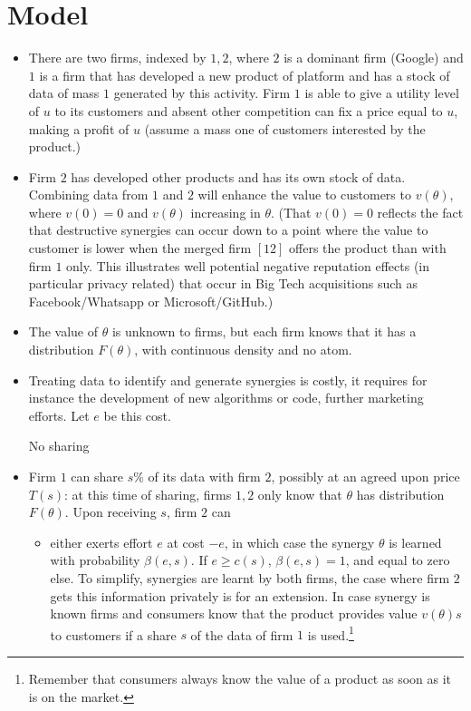 \documentclass[a4paper,leqno]{article}%
\renewcommand{\t}{\theta}
\begin{document}
\section{Model}
\begin{itemize}
    \item There are two firms, indexed by $1,2$, where $2$ is a dominant firm (Google) and $1$ is a firm that has developed a new product of platform and has a stock of data of mass $1$ generated by this activity. Firm $1$ is able to give a utility level of $u$ to its customers and absent other competition can fix a price equal to $u$, making a profit of $u$ (assume a mass one of customers interested by the product.)
    \item Firm $2$ has developed other products and has its own stock of data. Combining data from $1$ and $2$ will enhance the value to customers to $v(\t)$, where $v(0)=0$ and $v(\t)$ increasing in $\t$. (That $v(0)=0$ reflects the fact that destructive synergies can occur down to a point where the value to customer is lower when the merged firm $[12]$ offers the product than with firm $1$ only. This illustrates well potential negative reputation effects (in particular privacy related) that occur in Big Tech acquisitions such as Facebook/Whatsapp or Microsoft/GitHub.)
    \item The value of $\t$ is unknown to firms, but each firm knows that it has a distribution $F(\t)$, with continuous density and no atom.
    \item Treating data to identify and generate synergies is costly, it requires for instance the development of new algorithms or code, further marketing efforts. Let $e$ be this cost. 
    \item [No sharing]
    \item Firm $1$ can share $s\%$ of its data with firm $2$, possibly at an agreed upon price $T(s)$: at this time of sharing, firms $1,2$ only know that $\t$ has distribution $F(\t)$. Upon receiving $s$, firm $2$ can 
    \begin{itemize}
        \item either exerts effort $e$ at cost $-e$, in which case the synergy $\t$ is learned with probability $\beta(e,s)$. If $e\geq c(s)$, $\beta(e,s)=1$, and equal to zero else. To simplify, synergies are learnt by both firms, the case where firm $2$ gets this information privately is for an extension. In case synergy is known firms and consumers know that the product provides value $v(\t)s$ to customers if a share $s$ of the data of firm $1$ is used.\footnote{Remember that consumers always know the value of a product as soon as it is on the market.} 

\end{itemize}
\end{itemize}
\end{document}
